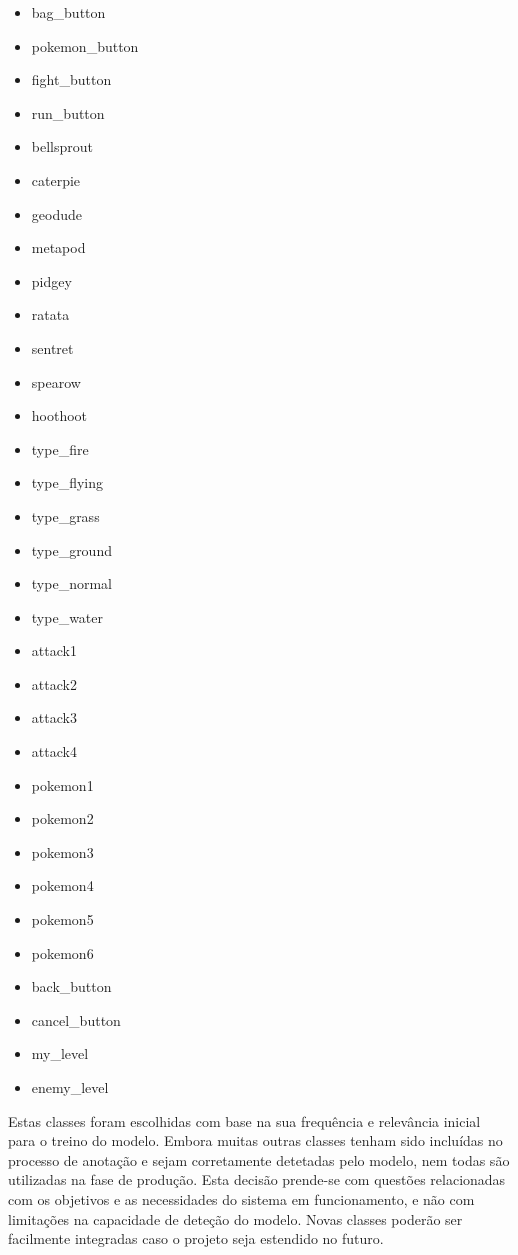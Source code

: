 \begin{multicols}{3} \begin{itemize} 
\item bag\_button	
\item pokemon\_button	
\item fight\_button	
\item run\_button	
\item bellsprout	
\item caterpie	
\item geodude	
\item metapod	
\item pidgey	
\item ratata	
\item sentret	
\item spearow
\item hoothoot
\item type\_fire	
\item type\_flying	
\item type\_grass	
\item type\_ground	
\item type\_normal
\item type\_water
\item attack1
\item attack2
\item attack3
\item attack4
\item pokemon1
\item pokemon2
\item pokemon3
\item pokemon4
\item pokemon5
\item pokemon6
\item back\_button
\item cancel\_button
\item my\_level
\item enemy\_level
\end{itemize} \end{multicols}

Estas classes foram escolhidas com base na sua frequência e relevância inicial para o treino do modelo. Embora muitas outras classes tenham sido incluídas no processo de anotação e sejam corretamente detetadas pelo modelo, nem todas são utilizadas na fase de produção. Esta decisão prende-se com questões relacionadas com os objetivos e as necessidades do sistema em funcionamento, e não com limitações na capacidade de deteção do modelo. Novas classes poderão ser facilmente integradas caso o projeto seja estendido no futuro.
